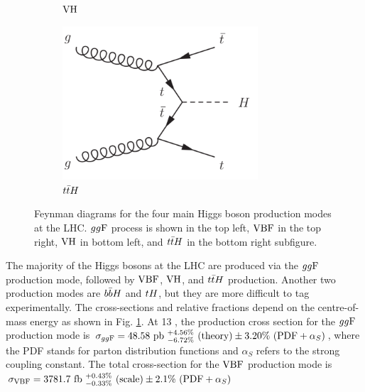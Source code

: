 \begin{figure}[h]
\begin{subfigure}[b]{0.5\textwidth}
    \caption{$\text{VH}$}
  \end{subfigure}%
  \begin{subfigure}[b]{0.5\textwidth}
    \centering
    \includegraphics[width=0.8\textwidth]{figures/theory/ttH}
    \caption{$t\bar{t} H$}
  \end{subfigure}
  \caption[Feynman diagrams for the four main Higgs boson production modes at the LHC.]
  {Feynman diagrams for the four main Higgs boson production modes at the LHC.
  $gg\text{F}$ process is shown in the top left, $\text{VBF}$ in the top right, $\text{VH}$ in bottom left, and
  $t\bar{t} H$ in the bottom right subfigure.}
   \label{fig:the:prod}
\end{figure}

The majority of the Higgs bosons at the LHC are produced via the $gg\text{F}$ production mode,
followed by $\text{VBF}$, $\text{VH}$, and $t\bar{t} H$ production. Another two production modes are $b\bar{b} H$
and $tH$, but they are more difficult to tag experimentally. The cross-sections and
relative fractions depend on the centre-of-mass energy as shown in Fig. \ref{fig:the:prod}.
At 13 \TeV, the production cross section for the $gg\text{F}$ production mode is
$\sigma_{gg\text{F}} = 48.58~\text{pb}
~^{+4.56\%}_{-6.72\%}~(\text{theory})
\pm 3.20\%~(\text{PDF}+\alpha_S)$,
where the PDF stands for parton distribution functions and $\alpha_S$ refers to the strong
coupling constant. The total cross-section for the $\text{VBF}$ production mode is
$\sigma_{\text{VBF}} = 3781.7~\text{fb}
~^{+0.43\%}_{-0.33\%}~(\text{scale})
\pm 2.1\%~(\text{PDF}+\alpha_S) $

